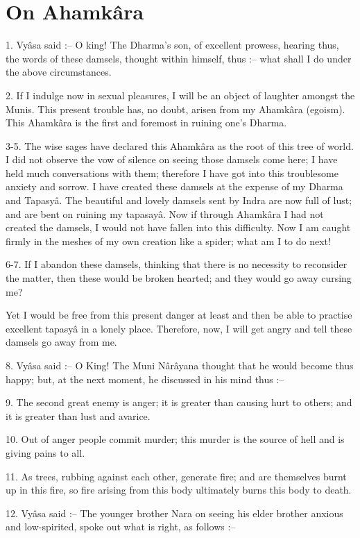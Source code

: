 ﻿\chapter{On Ahamk\^ara}

1. Vy\^asa said :-- O king! The Dharma's son, of excellent prowess, hearing thus, the words of these damsels, thought within himself, thus :-- what shall I do under the above circumstances.

2. If I indulge now in sexual pleasures, I will be an object of laughter amongst the Munis. This present trouble has, no doubt, arisen from my Ahamk\^ara (egoism). This Ahamk\^ara is the first and foremost in ruining one's Dharma.

3-5. The wise sages have declared this Ahamk\^ara as the root of this tree of world. I did not observe the vow of silence on seeing those damsels come here; I have held much conversations with them; therefore I have got into this troublesome anxiety and sorrow. I have created these damsels at the expense of my Dharma and Tapasy\^a. The beautiful and lovely damsels sent by Indra are now full of lust; and are bent on ruining my tapasay\^a. Now if through Ahamk\^ara I had not created the damsels, I would not have fallen into this difficulty. Now I am caught firmly in the meshes of my own creation like a spider; what am I to do next!

6-7. If I abandon these damsels, thinking that there is no necessity to reconsider the matter, then these would be broken hearted; and they would go away cursing me?

Yet I would be free from this present danger at least and then be able to practise excellent tapasy\^a in a lonely place. Therefore, now, I will get angry and tell these damsels go away from me.

8. Vy\^asa said :-- O King! The Muni N\^ar\^ayana thought that he would become thus happy; but, at the next moment, he discussed in his mind thus :--

9. The second great enemy is anger; it is greater than causing hurt to others; and it is greater than lust and avarice.

10. Out of anger people commit murder; this murder is the source of hell and is giving pains to all.

11. As trees, rubbing against each other, generate fire; and are themselves burnt up in this fire, so fire arising from this body ultimately burns this body to death.

12. Vy\^asa said :-- The younger brother Nara on seeing his elder brother anxious and low-spirited, spoke out what is right, as follows :--

